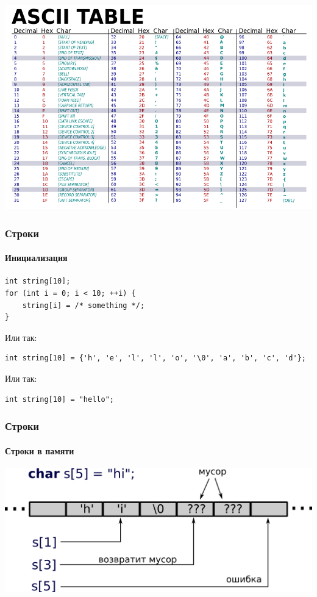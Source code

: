 \documentclass[14pt,pdf,hyperref={unicode}]{beamer}
\begin{document}
\begin{frame}[fragile]
\begin{center}
\includegraphics[width=1.02\linewidth]{images/ascii.png}
\end{center}
\end{frame}



\begin{frame}[fragile]
\frametitle{Строки} 
\framesubtitle{Инициализация}
\begin{lstlisting}
int string[10];
for (int i = 0; i < 10; ++i) {
    string[i] = /* something */;
}
\end{lstlisting}
Или так:\\
\begin{lstlisting}
int string[10] = {'h', 'e', 'l', 'l', 'o', '\0', 'a', 'b', 'c', 'd'};
\end{lstlisting}
Или так:\\
\begin{lstlisting}
int string[10] = "hello";
\end{lstlisting}
\end{frame}

\begin{frame}[fragile]
\frametitle{Строки} 
\framesubtitle{Строки в памяти}
\begin{center}
\includegraphics[width=0.95\linewidth]{images/string_in_memory.png}
\end{center}
\end{frame}
\end{document}

